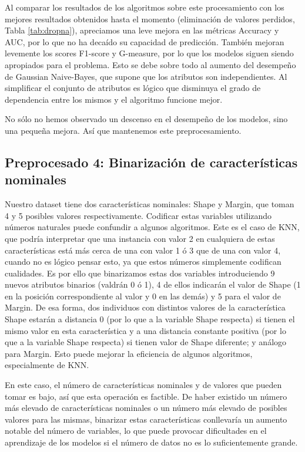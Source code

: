 \documentclass{article}
\begin{document}
Al comparar los resultados de los algoritmos sobre este procesamiento
con los mejores resultados obtenidos hasta el momento (eliminación de
valores perdidos, Tabla \ref{tab:dropna}), apreciamos una leve mejora
en las métricas Accuracy y AUC, por lo que no ha decaído su capacidad
de predicción. También mejoran levemente los scores F1-score y
G-measure, por lo que los modelos siguen siendo apropiados para el
problema. Esto se debe sobre todo al aumento del desempeño de Gaussian
Naive-Bayes, que supone que los atributos son independientes. Al
simplificar el conjunto de atributos es lógico que disminuya el grado
de dependencia entre los mismos y el algoritmo funcione mejor.

No sólo no hemos observado un descenso en el desempeño de los modelos,
sino una pequeña mejora. Así que mantenemos este preprocesamiento.

\subsection{Preprocesado 4: Binarización de características nominales}

Nuestro dataset tiene dos características nominales: Shape y Margin,
que toman 4 y 5 posibles valores respectivamente. Codificar estas
variables utilizando números naturales puede confundir a algunos
algoritmos. Este es el caso de KNN, que podría interpretar que una
instancia con valor 2 en cualquiera de estas características está más
cerca de una con valor 1 ó 3 que de una con valor 4, cuando no es
lógico pensar esto, ya que estos números simplemente codifican
cualidades. Es por ello que binarizamos estas dos variables
introduciendo 9 nuevos atributos binarios (valdrán 0 ó 1), 4 de ellos
indicarán el valor de Shape (1 en la posición correspondiente al valor
y 0 en las demás) y 5 para el valor de Margin. De esa forma, dos
individuos con distintos valores de la característica Shape estarán a
distancia 0 (por lo que a la variable Shape respecta) si tienen el
mismo valor en esta característica y a una distancia constante
positiva (por lo que a la variable Shape respecta) si tienen valor de
Shape diferente; y análogo para Margin. Esto puede mejorar la
eficiencia de algunos algoritmos, especialmente de KNN.

En este caso, el número de características nominales y de valores que
pueden tomar es bajo, así que esta operación es factible. De haber
existido un número más elevado de características nominales o un
número más elevado de posibles valores para las mismas, binarizar
estas características conllevaría un aumento notable del número de
variables, lo que puede provocar dificultades en el aprendizaje de los
modelos si el número de datos no es lo suficientemente grande.
\end{document}
